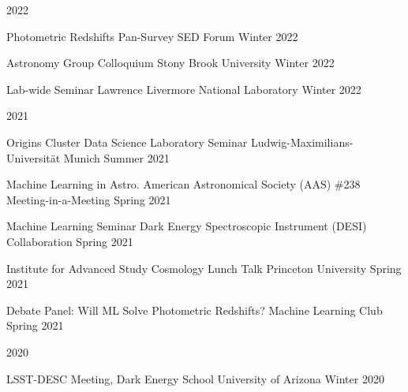\documentclass[11pt,letterpaper]{article}
\begin{document}

%

%
\clearpage

\nopagebreak\begin{list}{}{\malzlist}
	\item 2022
	\nopagebreak\begin{list}{}{\malzlist}
		\item \talk{}
		{Photometric Redshifts}
		{Pan-Survey SED Forum}
		{Winter 2022}
		\item \talk{}
		{Astronomy Group Colloquium}
		{Stony Brook University}
		{Winter 2022}
		\item \talk{}
		{Lab-wide Seminar}
		{Lawrence Livermore National Laboratory}
		{Winter 2022}
	\end{list}
	\item 2021
\nopagebreak\begin{list}{}{\malzlist}
\item \talk{}
	{Origins Cluster Data Science Laboratory Seminar}
	{Ludwig-Maximilians-Universit{\"a}t Munich}%
	{Summer 2021}
\item {}
	{Machine Learning in Astro.}%
	{American Astronomical Society (AAS) \#238 Meeting-in-a-Meeting}
	{Spring 2021}
\item \talk{}
	{Machine Learning Seminar}
	{Dark Energy Spectroscopic Instrument (DESI) Collaboration}
	{Spring 2021}
\item \talk{}
	{Institute for Advanced Study Cosmology Lunch Talk}
	{Princeton University}
	{Spring 2021}
\item \talk{}
	{Debate Panel: Will ML Solve Photometric Redshifts?}
	{Machine Learning Club}
	{Spring 2021}
\end{list}
\item 2020
\nopagebreak\begin{list}{}{\malzlist}
\item {}
	{LSST-DESC Meeting, Dark Energy School}
	{University of Arizona}
	{Winter 2020}
\end{list}

\end{list}
\end{document}
